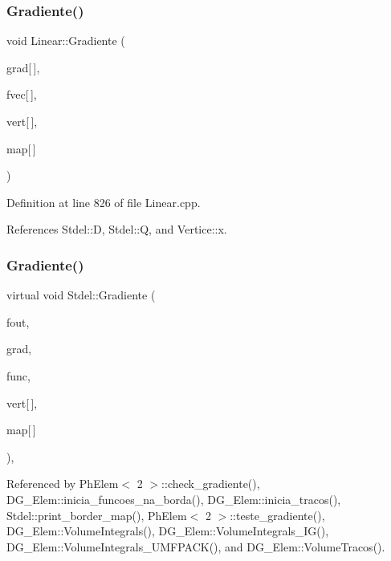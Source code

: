\subsubsection{\texorpdfstring{Gradiente()}{Gradiente()}\hspace{0.1cm}{\footnotesize\ttfamily [3/6]}}
{\footnotesize\ttfamily void Linear\+::\+Gradiente (\begin{DoxyParamCaption}\item[{double $\ast$}]{grad\mbox{[}$\,$\mbox{]},  }\item[{const double}]{fvec\mbox{[}$\,$\mbox{]},  }\item[{const \hyperlink{structVertice}{Vertice}}]{vert\mbox{[}$\,$\mbox{]},  }\item[{const int}]{map\mbox{[}$\,$\mbox{]} }\end{DoxyParamCaption})\hspace{0.3cm}{\ttfamily [virtual]}}



Definition at line 826 of file Linear.\+cpp.



References Stdel\+::D, Stdel\+::Q, and Vertice\+::x.

\mbox{\label{classStdel_af3e65d1ad0d59ded925a3f5a9d0fb100}} 
\subsubsection{\texorpdfstring{Gradiente()}{Gradiente()}\hspace{0.1cm}{\footnotesize\ttfamily [4/6]}}
{\footnotesize\ttfamily virtual void Stdel\+::\+Gradiente (\begin{DoxyParamCaption}\item[{F\+I\+LE $\ast$}]{fout,  }\item[{double $\ast$$\ast$}]{grad,  }\item[{double($\ast$)(double, double, double)}]{func,  }\item[{const \hyperlink{structVertice}{Vertice}}]{vert\mbox{[}$\,$\mbox{]},  }\item[{const int}]{map\mbox{[}$\,$\mbox{]} }\end{DoxyParamCaption})\hspace{0.3cm}{\ttfamily [pure virtual]}, {\ttfamily [inherited]}}



Referenced by Ph\+Elem$<$ 2 $>$\+::check\+\_\+gradiente(), D\+G\+\_\+\+Elem\+::inicia\+\_\+funcoes\+\_\+na\+\_\+borda(), D\+G\+\_\+\+Elem\+::inicia\+\_\+tracos(), Stdel\+::print\+\_\+border\+\_\+map(), Ph\+Elem$<$ 2 $>$\+::teste\+\_\+gradiente(), D\+G\+\_\+\+Elem\+::\+Volume\+Integrals(), D\+G\+\_\+\+Elem\+::\+Volume\+Integrals\+\_\+\+I\+G(), D\+G\+\_\+\+Elem\+::\+Volume\+Integrals\+\_\+\+U\+M\+F\+P\+A\+C\+K(), and D\+G\+\_\+\+Elem\+::\+Volume\+Tracos().

